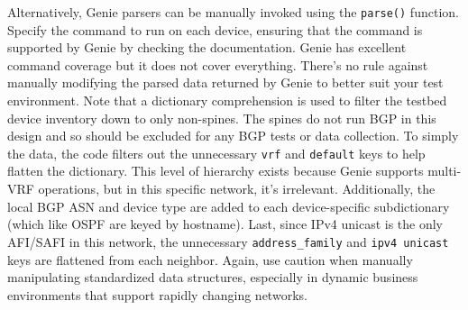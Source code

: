 Alternatively, Genie parsers can be manually invoked using the \verb|parse()|
function. Specify the command to run on each device, ensuring that the command
is supported by Genie by checking the documentation. Genie has excellent
command coverage but it does not cover everything. There's no rule against
manually modifying the parsed data returned by Genie to better suit your test
environment. Note that a dictionary comprehension is used to filter the
testbed device inventory down to only non-spines. The spines do not run BGP
in this design and so should be excluded for any BGP tests or data collection.
To simply the data, the code filters out the unnecessary \verb|vrf|
and \verb|default| keys to help flatten the dictionary. This level of
hierarchy exists because Genie supports multi-VRF operations, but in this
specific network, it's irrelevant. Additionally, the
local BGP ASN and device type are added to each device-specific subdictionary
(which like OSPF are keyed by hostname). Last, since IPv4 unicast is the only
AFI/SAFI in this network, the unnecessary \verb|address_family| and
\verb|ipv4 unicast| keys are flattened from each neighbor. Again, use caution
when manually manipulating standardized data structures, especially in
dynamic business environments that support rapidly changing networks.

